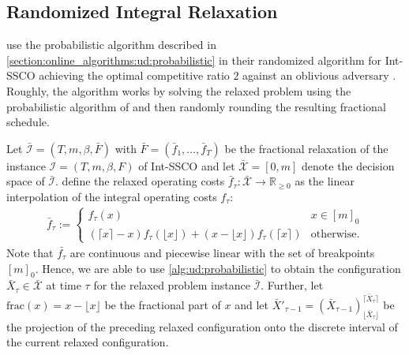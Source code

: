 \subsection{Randomized Integral Relaxation}

\citeauthor*{Albers2018} use the probabilistic algorithm described in \autoref{section:online_algorithms:ud:probabilistic} in their randomized algorithm for Int-SSCO achieving the optimal competitive ratio $2$ against an oblivious adversary \cite{Albers2018}. Roughly, the algorithm works by solving the relaxed problem using the probabilistic algorithm of \citeauthor*{Bansal2015} and then randomly rounding the resulting fractional schedule.

Let $\bar{\mathcal{I}} = (T, m, \beta, \bar{F})$ with $\bar{F} = (\bar{f}_1, \dots, \bar{f}_T)$ be the fractional relaxation of the instance $\mathcal{I} = (T, m, \beta, F)$ of Int-SSCO and let $\bar{\mathcal{X}} = [0,m]$ denote the decision space of $\bar{\mathcal{I}}$. \citeauthor*{Albers2018} define the relaxed operating costs $\bar{f}_{\tau} : \bar{\mathcal{X}} \to \mathbb{R}_{\geq 0}$ as the linear interpolation of the integral operating costs $f_{\tau}$: \begin{align*}
    \bar{f}_{\tau} := \begin{cases}
        f_{\tau}(x) & x \in [m]_0 \\
        (\lceil x \rceil - x) f_{\tau}(\lfloor x \rfloor) + (x - \lfloor x \rfloor) f_{\tau}(\lceil x \rceil) & \text{otherwise}.
    \end{cases}
\end{align*} Note that $\bar{f_{\tau}}$ are continuous and piecewise linear with the set of breakpoints $[m]_0$. Hence, we are able to use \autoref{alg:ud:probabilistic} to obtain the configuration $\bar{X}_{\tau} \in \bar{\mathcal{X}}$ at time $\tau$ for the relaxed problem instance  $\bar{\mathcal{I}}$. Further, let $\text{frac}(x) = x - \lfloor x \rfloor$ be the fractional part of $x$ and let $\bar{X}'_{\tau-1} = (\bar{X}_{\tau-1})_{\lfloor\bar{X}_{\tau}\rfloor}^{\lceil\bar{X}_{\tau}\rceil}$ be the projection of the preceding relaxed configuration onto the discrete interval of the current relaxed configuration.

